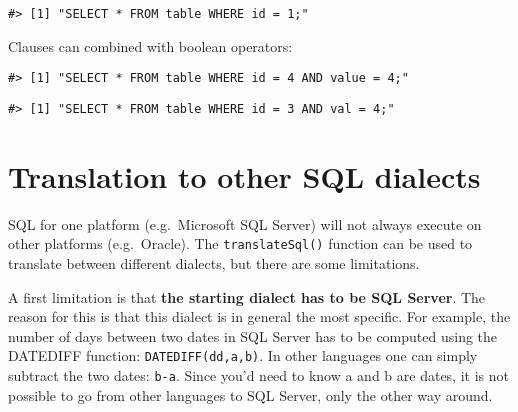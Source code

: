 \documentclass[]{article}
\newenvironment{Shaded}{\begin{snugshade}}{\end{snugshade}}
\newcommand{\DataTypeTok}[1]{\textcolor[rgb]{0.13,0.29,0.53}{#1}}
\newcommand{\DecValTok}[1]{\textcolor[rgb]{0.00,0.00,0.81}{#1}}
\newcommand{\KeywordTok}[1]{\textcolor[rgb]{0.13,0.29,0.53}{\textbf{#1}}}
\newcommand{\NormalTok}[1]{#1}
\newcommand{\OperatorTok}[1]{\textcolor[rgb]{0.81,0.36,0.00}{\textbf{#1}}}
\newcommand{\StringTok}[1]{\textcolor[rgb]{0.31,0.60,0.02}{#1}}
\begin{document}
\begin{verbatim}
#> [1] "SELECT * FROM table WHERE id = 1;"
\end{verbatim}

Clauses can combined with boolean operators:

\begin{Shaded}
\end{Shaded}

\begin{verbatim}
#> [1] "SELECT * FROM table WHERE id = 4 AND value = 4;"
\end{verbatim}

\begin{Shaded}
\end{Shaded}

\begin{verbatim}
#> [1] "SELECT * FROM table WHERE id = 3 AND val = 4;"
\end{verbatim}

\hypertarget{translation-to-other-sql-dialects}{%
\section{Translation to other SQL
dialects}\label{translation-to-other-sql-dialects}}

SQL for one platform (e.g.~Microsoft SQL Server) will not always execute
on other platforms (e.g.~Oracle). The \texttt{translateSql()} function
can be used to translate between different dialects, but there are some
limitations.

A first limitation is that \textbf{the starting dialect has to be SQL
Server}. The reason for this is that this dialect is in general the most
specific. For example, the number of days between two dates in SQL
Server has to be computed using the DATEDIFF function:
\texttt{DATEDIFF(dd,a,b)}. In other languages one can simply subtract
the two dates: \texttt{b-a}. Since you'd need to know a and b are dates,
it is not possible to go from other languages to SQL Server, only the
other way around.
\end{document}
